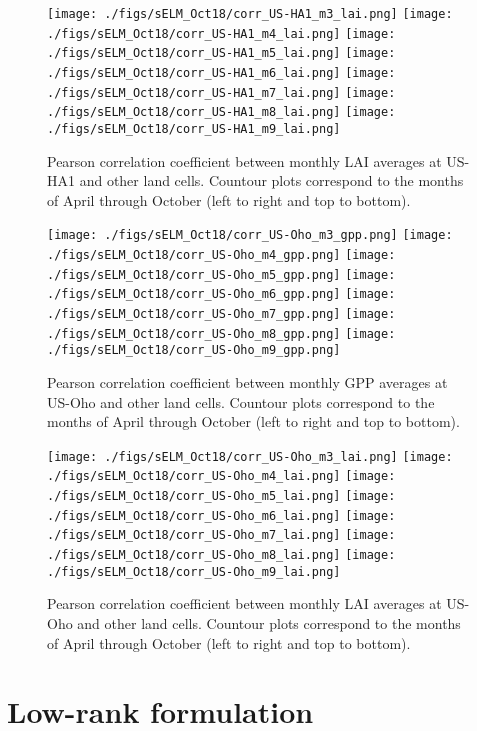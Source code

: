 \documentclass[10pt]{article}
\begin{document}
\begin{figure}[htb!]
\centering
\texttt{[image: ./figs/sELM\_Oct18/corr\_US-HA1\_m3\_lai.png]}
\texttt{[image: ./figs/sELM\_Oct18/corr\_US-HA1\_m4\_lai.png]}
\texttt{[image: ./figs/sELM\_Oct18/corr\_US-HA1\_m5\_lai.png]}
\texttt{[image: ./figs/sELM\_Oct18/corr\_US-HA1\_m6\_lai.png]}
\texttt{[image: ./figs/sELM\_Oct18/corr\_US-HA1\_m7\_lai.png]}
\texttt{[image: ./figs/sELM\_Oct18/corr\_US-HA1\_m8\_lai.png]}
\texttt{[image: ./figs/sELM\_Oct18/corr\_US-HA1\_m9\_lai.png]}
\caption{Pearson correlation coefficient between monthly LAI averages at US-HA1 and other land cells. 
Countour plots correspond to the months of April through October (left to right and top to bottom).
\label{fig:laicorrUSHA1}}
\end{figure}

\begin{figure}[htb!]
\centering
\texttt{[image: ./figs/sELM\_Oct18/corr\_US-Oho\_m3\_gpp.png]}
\texttt{[image: ./figs/sELM\_Oct18/corr\_US-Oho\_m4\_gpp.png]}
\texttt{[image: ./figs/sELM\_Oct18/corr\_US-Oho\_m5\_gpp.png]}
\texttt{[image: ./figs/sELM\_Oct18/corr\_US-Oho\_m6\_gpp.png]}
\texttt{[image: ./figs/sELM\_Oct18/corr\_US-Oho\_m7\_gpp.png]}
\texttt{[image: ./figs/sELM\_Oct18/corr\_US-Oho\_m8\_gpp.png]}
\texttt{[image: ./figs/sELM\_Oct18/corr\_US-Oho\_m9\_gpp.png]}
\caption{Pearson correlation coefficient between monthly GPP averages at US-Oho and other land cells. 
Countour plots correspond to the months of April through October (left to right and top to bottom).
\label{fig:gppcorrUSOho}}
\end{figure}

\begin{figure}[htb!]
\centering
\texttt{[image: ./figs/sELM\_Oct18/corr\_US-Oho\_m3\_lai.png]}
\texttt{[image: ./figs/sELM\_Oct18/corr\_US-Oho\_m4\_lai.png]}
\texttt{[image: ./figs/sELM\_Oct18/corr\_US-Oho\_m5\_lai.png]}
\texttt{[image: ./figs/sELM\_Oct18/corr\_US-Oho\_m6\_lai.png]}
\texttt{[image: ./figs/sELM\_Oct18/corr\_US-Oho\_m7\_lai.png]}
\texttt{[image: ./figs/sELM\_Oct18/corr\_US-Oho\_m8\_lai.png]}
\texttt{[image: ./figs/sELM\_Oct18/corr\_US-Oho\_m9\_lai.png]}
\caption{Pearson correlation coefficient between monthly LAI averages at US-Oho and other land cells. 
Countour plots correspond to the months of April through October (left to right and top to bottom).
\label{fig:laicorrUSOho}}
\end{figure}

\section{Low-rank formulation}
\end{document}
